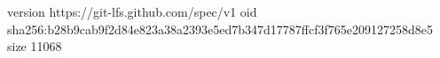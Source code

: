 version https://git-lfs.github.com/spec/v1
oid sha256:b28b9cab9f2d84e823a38a2393e5ed7b347d17787ffcf3f765e209127258d8e5
size 11068
